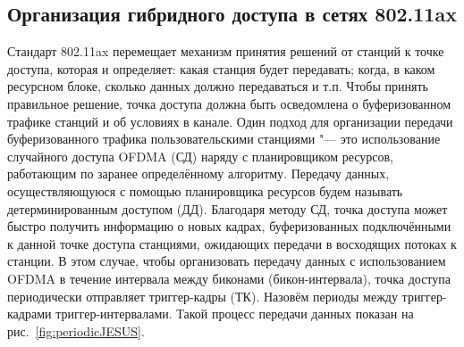 \subsection{Организация гибридного доступа в сетях 802.11ax}\label{sluchdostup}

Стандарт 802.11ax перемещает механизм принятия решений от станций к точке доступа, которая и определяет: какая станция будет передавать; когда, в каком ресурсном блоке, сколько данных должно передаваться и т.п.
Чтобы принять правильное решение, точка доступа должна быть осведомлена о буферизованном трафике станций и об условиях в канале. 
Один подход для организации передачи буферизованного трафика пользовательскими станциями "--- это использование случайного доступа OFDMA (СД) наряду с планировщиком ресурсов, работающим по заранее определённому алгоритму. Передачу данных, осуществляющуюся с помощью планировщика ресурсов будем называть детерминированным доступом (ДД). 
Благодаря методу СД, точка доступа может быстро получить информацию о новых кадрах, буферизованных подключёнными к данной точке доступа станциями, ожидающих передачи в восходящих потоках к станции. В этом случае, чтобы организовать передачу данных с использованием OFDMA в течение интервала между биконами (бикон-интервала), точка доступа периодически отправляет триггер-кадры (ТК). Назовём периоды между триггер-кадрами триггер-интервалами. Такой процесс передачи данных показан на рис.~\ref{fig:periodicJESUS}.
